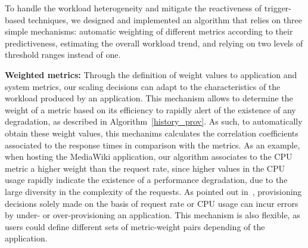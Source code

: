 To handle the workload heterogeneity and mitigate the reactiveness of
trigger-based techniques, we designed and implemented an algorithm
that relies on three simple mechanisms: automatic weighting of
different metrics according to their predictiveness, estimating the
overall workload trend, and relying on two levels of threshold ranges
instead of one.

\vspace{2mm}


\textbf{Weighted metrics:} Through the definition of weight values to
application and system metrics, our scaling decisions can adapt to the
characteristics of the workload produced by an application. This
mechanism allows to determine the weight of a metric based on its
efficiency to rapidly alert of the existence of any degradation, as
described in Algorithm~\ref{history_prov}. As such, to automatically
obtain these weight values, this mechanims calculates the correlation
coefficients associated to the response times in comparison with the
metrics. As an example, when hosting the MediaWiki application, our
algorithm associates to the CPU metric a higher weight than the
request rate, since higher values in the CPU usage rapidly indicate
the existence of a performance degradation, due to the large diversity
in the complexity of the requests. As pointed out
in~\cite{singh_autonomic_2010}, provisioning decisions solely made on
the basis of request rate or CPU usage can incur errors by under- or
over-provisioning an application. This mechanism is also flexible, as
users could define different sets of metric-weight pairs depending of
the application.



